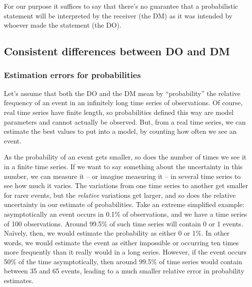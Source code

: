 \documentclass[%
	a4paper,
	abstract=true,	
	12pt,
	numbers=noenddot,
]{scrartcl}
\newcommand{\seclabel}[1]{\label{sec:#1}}
\begin{document}
For our purpose it suffices to say that there's no guarantee that a probabilistic statement will be interpreted by the receiver (the DM) as it was intended by whoever made the statement (the DO).

\subsection{Consistent differences between DO and DM \seclabel{condition2}}

\subsubsection*{Estimation errors for probabilities}
Let's assume that both the DO and the DM mean by ``probability'' the relative frequency of an event in an infinitely long time series of observations. Of course, real time series have finite length, so probabilities defined this way are model parameters and cannot actually be observed. But, from a real time series, we can estimate the best values to put into a model, by counting how often we see an event.

As the probability of an event gets smaller, so does the number of times we see it in a finite time series. If we want to say something about the uncertainty in this number, we can measure it -- or imagine measuring it -- in several time series to see how much it varies. The variations from one time series to another get smaller for rarer events, but the \textit{relative} variations get larger, and so does the relative uncertainty in our estimate of probabilities. Take an extreme simplified example: asymptotically an event occurs in 0.1\% of observations, and we have a time series of 100 observations.
Around 99.5\% of such time series will contain 0 or 1 events. Na\"{i}vely, then, we would estimate the probability as either 0 or 1\%. In other words, we would estimate the event as either impossible or occurring ten times more frequently than it really would in a long series. However, if the event occurs 50\% of the time asymptotically, then around 99.5\% of time series would contain between 35 and 65 events, leading to a much smaller relative error in probability estimates.
\end{document}
